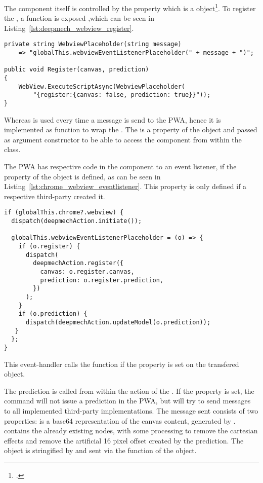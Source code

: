 The  component itself is controlled by the  property which is a  object\footnote{.}.
To register the , a  function is exposed ,which can be seen in Listing~\ref{lst:deepmech_webview_register}.

\begin{lstlisting}[label={lst:deepmech_webview_register}, caption={DeepmechWebView Register function}]
private string WebviewPlaceholder(string message)
    => "globalThis.webviewEventListenerPlaceholder(" + message + ")";

public void Register(canvas, prediction)
{
    WebView.ExecuteScriptAsync(WebviewPlaceholder(
        "{register:{canvas: false, prediction: true}}"));
}
\end{lstlisting}

Whereas  is used every time a message is send to the PWA, hence it is implemented as function to wrap the .
The  is a property of the  object and passed as argument constructor to be able to access the  component from within the class.

The PWA has respective code in the  component to an event listener, if the  property of the  object is defined, as can be seen in Listing~\ref{lst:chrome_webview_eventlistener}.
This  property is only defined if a respective third-party created it.

\begin{lstlisting}[label={lst:chrome_webview_eventlistener}, caption={PWA event-handler for the chrome webview}]
if (globalThis.chrome?.webview) {
  dispatch(deepmechAction.initiate());

  globalThis.webviewEventListenerPlaceholder = (o) => {
    if (o.register) {
      dispatch(
        deepmechAction.register({
          canvas: o.register.canvas,
          prediction: o.register.prediction,
        })
      );
    }
    if (o.prediction) {
      dispatch(deepmechAction.updateModel(o.prediction));
   }
  };
}
\end{lstlisting}

This event-handler calls the  function if the  property is set on the transfered object.

The prediction is called from within the  action of the .
If the  property is set, the  command will not issue a prediction in the PWA, but will try to send messages to all implemented third-party implementations.
The message sent consists of two properties:
 is a base64 representation of the canvas content, generated by .
 contains the already existing nodes, with some processing to remove the cartesian effects and remove the artificial 16 pixel offset created by the prediction.
The object is stringified by  and sent via the  function of the  object.

